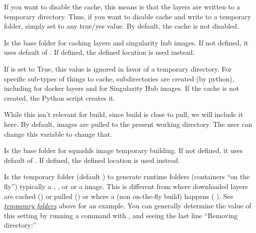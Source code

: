 \documentclass[letterpaper,10pt,english]{sphinxmanual}
\begin{document}
 If you want to disable the cache, this
means is that the layers are written to a temporary directory. Thus,
if you want to disable cache and write to a temporary folder, simply
set  to any true/yes value. By default, the cache is not disabled.

 Is the base folder for caching layers and
singularity hub images. If not defined, it uses default of . If
defined, the defined location is used instead.

If  is set to True, this value is ignored in favor of a temporary
directory. For specific sub-types of things to cache, subdirectories
are created (by python), including  for docker layers and  for
Singularity Hub images. If the cache is not created, the Python script
creates it.

 While this isn’t relevant for build, since
build is close to pull, we will include it here. By default, images
are pulled to the present working directory. The user can change this
variable to change that.

 Is the base folder for squashfs image
temporary building. If not defined, it uses default of . If defined,
the defined location is used instead.

 Is the temporary folder (default ) to
generate runtime folders (containers “on the fly”) typically a ,  , or 
or a  image. This is different from where downloaded layers are cached
() or pulled () or where a (non on-the-fly build) happens (  ). See
{\hyperref[\detokenize{build_environment:temporary-folders}]{\emph{temporary folders}}} above for an example. You can generally determine the value of this
setting by running a command with  , and seeing the last line “Removing
directory:”
\end{document}
